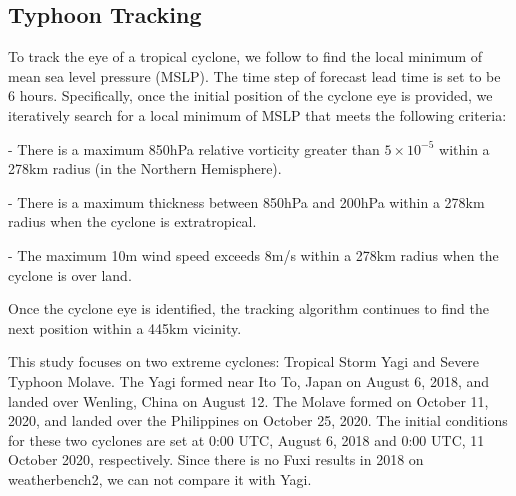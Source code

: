 \subsection{Typhoon Tracking}   
To track the eye of a tropical cyclone, we follow \cite{bi2023accurate,magnusson2021tropical} to find the local minimum of mean sea level pressure (MSLP). The time step of forecast lead time is set to be 6 hours. Specifically, once the initial position of the cyclone eye is provided, we iteratively search for a local minimum of MSLP that meets the following criteria:\par
- There is a maximum 850hPa relative vorticity greater than \(5 \times 10^{-5}\) within a 278km radius (in the Northern Hemisphere).\par
- There is a maximum thickness between 850hPa and 200hPa within a 278km radius when the cyclone is extratropical.\par
- The maximum 10m wind speed exceeds 8m/s within a 278km radius when the cyclone is over land.\par
Once the cyclone eye is identified, the tracking algorithm continues to find the next position within a 445km vicinity.\par
This study focuses on two extreme cyclones: Tropical Storm Yagi and Severe Typhoon Molave. The Yagi formed near Ito To, Japan on August 6, 2018, and landed over Wenling, China on August 12. The Molave formed on October 11, 2020, and landed over the Philippines on October 25, 2020. The initial conditions for these two cyclones are set at 0:00 UTC,  August 6, 2018 and  0:00 UTC, 11 October 2020, respectively. Since there is no Fuxi results in 2018 on weatherbench2, we can not compare it with Yagi.
\label{appendix:typhoon}
    
   

                
    
    
    
